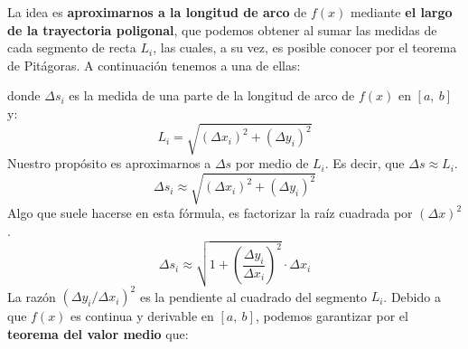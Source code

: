 \documentclass[12pt]{article}
\begin{document}
La idea es \textbf{aproximarnos a la longitud de arco} de $f(x)$ mediante \textbf{el largo de la trayectoria poligonal}, que podemos obtener al sumar las medidas de cada segmento de recta $L_{i}$, las cuales, a su vez, es posible conocer por el teorema de Pitágoras. A continuación tenemos a una de ellas:

\begin{figure}[hbt!]
\centering


\end{figure}

donde $\Delta s_{i}$ es la medida de una parte de la longitud de arco de $f(x)$ en $[a, \ b]$ y:
\[
  L_{i} = \sqrt{(\Delta x_{i})^{2} + (\Delta y_{i})^{2}}
\]
Nuestro propósito es aproximarnos a $\Delta s$ por medio de $L_{i}$. Es decir, que $\Delta s \approx L_{i}$.
\[
  \Delta s_{i} \approx \sqrt{(\Delta x_{i})^{2} + (\Delta y_{i})^{2}}
\]
Algo que suele hacerse en esta fórmula, es factorizar la raíz cuadrada por $(\Delta x)^{2}$.
\[
  \Delta s_{i} \approx \sqrt{1 + \left(\frac{\Delta y_{i}}{\Delta x_{i}}\right)^{2}} \cdot \Delta x_{i} 
\]
La razón $(\Delta y_{i} / \Delta x_{i})^{2}$ es la pendiente al cuadrado del segmento $L_{i}$. Debido a que $f(x)$ es continua y derivable en $[a, \ b]$, podemos garantizar por el \textbf{teorema del valor medio} que:
\end{document}
